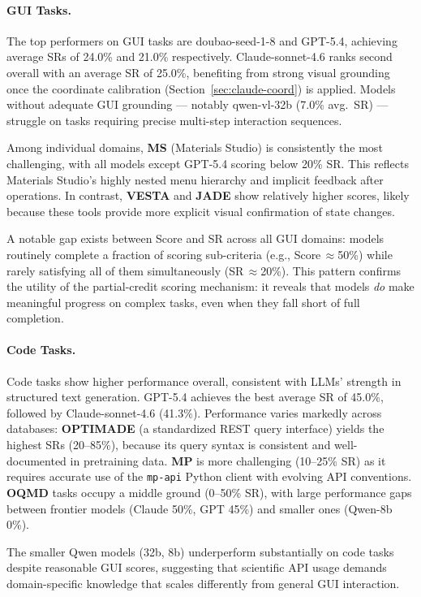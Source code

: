 \documentclass{article}
\begin{document}
\paragraph{GUI Tasks.}
The top performers on GUI tasks are doubao-seed-1-8 and GPT-5.4,
achieving average SRs of 24.0\% and 21.0\% respectively.
Claude-sonnet-4.6 ranks second overall with an average SR of 25.0\%,
benefiting from strong visual grounding once the coordinate calibration (Section~\ref{sec:claude-coord})
is applied.
Models without adequate GUI grounding — notably qwen-vl-32b (7.0\% avg.\ SR) —
struggle on tasks requiring precise multi-step interaction sequences.

Among individual domains, \textbf{MS} (Materials Studio) is consistently the most challenging,
with all models except GPT-5.4 scoring below 20\% SR.
This reflects Materials Studio's highly nested menu hierarchy and implicit feedback after operations.
In contrast, \textbf{VESTA} and \textbf{JADE} show relatively higher scores,
likely because these tools provide more explicit visual confirmation of state changes.

A notable gap exists between Score and SR across all GUI domains:
models routinely complete a fraction of scoring sub-criteria (e.g., Score\,$\approx$50\%)
while rarely satisfying all of them simultaneously (SR\,$\approx$20\%).
This pattern confirms the utility of the partial-credit scoring mechanism:
it reveals that models \emph{do} make meaningful progress on complex tasks,
even when they fall short of full completion.

\paragraph{Code Tasks.}
Code tasks show higher performance overall, consistent with LLMs' strength in structured
text generation.
GPT-5.4 achieves the best average SR of 45.0\%, followed by Claude-sonnet-4.6 (41.3\%).
Performance varies markedly across databases:
\textbf{OPTIMADE} (a standardized REST query interface) yields the highest SRs (20--85\%),
because its query syntax is consistent and well-documented in pretraining data.
\textbf{MP} is more challenging (10--25\% SR) as it requires accurate use of
the \texttt{mp-api} Python client with evolving API conventions.
\textbf{OQMD} tasks occupy a middle ground (0--50\% SR), with large performance gaps
between frontier models (Claude 50\%, GPT 45\%) and smaller ones (Qwen-8b 0\%).

The smaller Qwen models (32b, 8b) underperform substantially on code tasks
despite reasonable GUI scores, suggesting that scientific API usage demands
domain-specific knowledge that scales differently from general GUI interaction.
\end{document}
